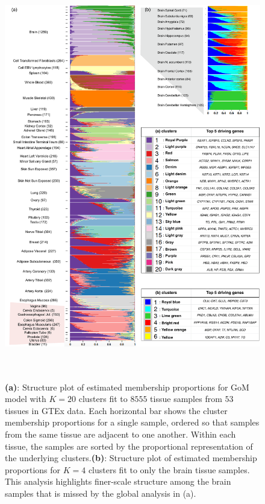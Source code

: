 \documentclass[10pt,letterpaper]{article}
\begin{document}
\begin{figure}[!h]
\includegraphics[height=7in, width=5.5in]{../plots/gtex-figures/gtex-k20-05-01-2016.pdf}
 \caption{ \textbf{(a)}: Structure plot of estimated membership proportions for GoM model with $K=20$ clusters fit to $8555$ tissue samples from $53$ tissues in GTEx data.  Each horizontal bar shows the cluster membership proportions for a single sample, ordered so that samples from the same tissue are adjacent to one another. Within each tissue, the samples are sorted by the proportional representation of the underlying clusters.\textbf{(b)}: Structure plot of estimated membership proportions for $K=4$ clusters fit to only the brain tissue samples. This analysis highlights finer-scale structure among the brain samples that is missed by the global analysis in (a).}
\label{fig1}
\end{figure}
\end{document}
